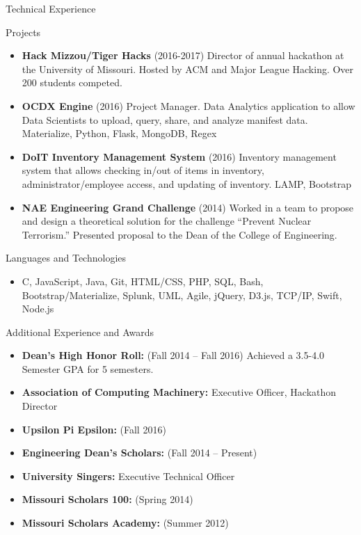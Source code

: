 \documentclass[]{mcdowellcv}
\begin{document}
    \begin{cvsection}{Technical Experience}
        \begin{cvsubsection}{Projects}{}{}
            \begin{itemize}
                \item \textbf{Hack Mizzou/Tiger Hacks} (2016-2017) Director of annual hackathon at the University of Missouri. Hosted by ACM and Major League Hacking. Over 200 students competed.
                \item \textbf{OCDX Engine} (2016) Project Manager. Data Analytics application to allow Data Scientists to upload, query, share, and analyze manifest data. Materialize, Python, Flask, MongoDB, Regex
                \item \textbf{DoIT Inventory Management System} (2016) Inventory management system that allows checking in/out of items in inventory, administrator/employee access, and updating of inventory. LAMP, Bootstrap
                \item \textbf{NAE Engineering Grand Challenge} (2014) Worked in a team to propose and design a theoretical solution for the challenge “Prevent Nuclear Terrorism.” Presented proposal to the Dean of the College of Engineering.
            \end{itemize}
        \end{cvsubsection}

      \begin{cvsubsection}{Languages and Technologies}{}{}
      \begin{itemize}
                \item C, JavaScript, Java, Git, HTML/CSS, PHP, SQL,  Bash, Bootstrap/Materialize, Splunk, UML, Agile, jQuery, D3.js, TCP/IP, Swift, Node.js
            \end{itemize}
       \end{cvsubsection}
    \end{cvsection}
    
    \begin{cvsection}{Additional Experience and Awards}
        \begin{cvsubsection}{}{}{}	
            \begin{itemize}
                \item \textbf{Dean’s High Honor Roll:}  (Fall 2014 -- Fall 2016) Achieved a 3.5-4.0 Semester GPA for 5 semesters.
                \item \textbf{Association of Computing Machinery:} Executive Officer, Hackathon Director
                \item \textbf{Upsilon Pi Epsilon:}  (Fall 2016)
                \item \textbf{Engineering Dean’s Scholars:} (Fall 2014 -- Present)
                \item \textbf{University Singers:} Executive Technical Officer
                \item \textbf{Missouri Scholars 100:} (Spring 2014)
                \item \textbf{Missouri Scholars Academy:} (Summer 2012)
            \end{itemize}
        \end{cvsubsection}
    \end{cvsection}
\end{document}
